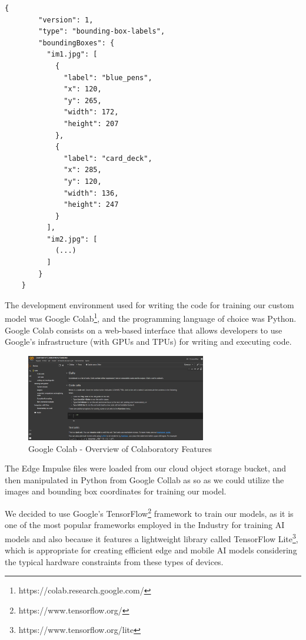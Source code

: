 \documentclass[openright]{normas-utf-tex} %
\begin{document}
\begin{lstlisting}[caption={Bounding boxes coordinates file exported from Edge Impulse},label={lst:boundingBoxCoordinates}]
	{
		"version": 1,
		"type": "bounding-box-labels",
		"boundingBoxes": {
		  "im1.jpg": [
			{
			  "label": "blue_pens",
			  "x": 120,
			  "y": 265,
			  "width": 172,
			  "height": 207
			},
			{
			  "label": "card_deck",
			  "x": 285,
			  "y": 120,
			  "width": 136,
			  "height": 247
			}
		  ],
		  "im2.jpg": [
			(...)
		  ]
		}
	}
\end{lstlisting}

The development environment used for writing the code for training our custom model
was Google Colab\footnote{https://colab.research.google.com/}, and the programming language 
of choice was Python. 
Google Colab consists on a web-based interface that allows developers
to use Google's infrastructure (with GPUs and TPUs) for writing and executing code.

\begin{figure}[H]
	\centering
	\includegraphics[width=0.7\textwidth]{./images/google-colab.png}
	\caption[Google Colab - Overview of Colaboratory Features]{Google Colab - Overview of Colaboratory Features}
    \label{fig:diff}
\end{figure}

The Edge Impulse files were loaded from our cloud object storage bucket, and then manipulated in Python
from Google Collab as so as we could utilize the images and bounding box coordinates for training
our model.

We decided to use Google's TensorFlow\footnote{https://www.tensorflow.org/} framework to train our 
models, as it is one of the most popular frameworks employed in the Industry for training AI models
and also because it features a lightweight library called TensorFlow Lite\footnote{https://www.tensorflow.org/lite}, 
which is appropriate for creating efficient edge and mobile AI models considering the 
typical hardware constraints from these types of devices.
\end{document}
